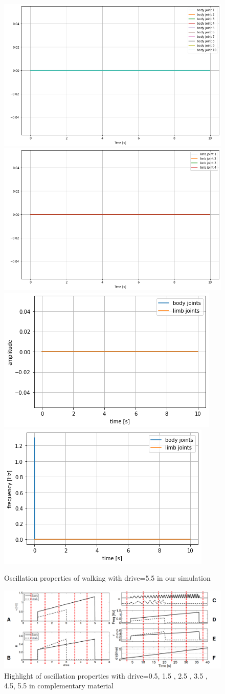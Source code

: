 \documentclass{cmc}
\begin{document}
\begin{figure}[H]
\centering
\includegraphics[height=0.3\columnwidth]{figures/8a_d55_spine.png}
\includegraphics[height=0.3\columnwidth]{figures/8a_d55_limb.png}
\includegraphics[height=0.3\columnwidth]{figures/8a_d55_amp.png}
\includegraphics[height=0.3\columnwidth]{figures/8a_d55_freq.png}
\caption{Oscillation properties of walking with drive=5.5 in our simulation}
\label{a5}
\end{figure}

\begin{figure}[H]
\centering
\includegraphics[height=0.3\columnwidth]{figures/8a_ref.png}
\caption{Highlight of oscillation properties with drive=0.5, 1.5 , 2.5 , 3.5 , 4.5, 5.5 in complementary material}
\label{a_ref}
\end{figure}
\end{document}
